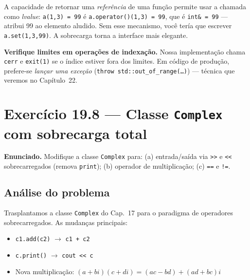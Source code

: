 \documentclass[11pt,a4paper]{article}
\begin{document}
\begin{obseng}
A capacidade de retornar uma \emph{refer\^encia} de uma fun\c{c}\~ao permite usar a chamada como \emph{lvalue}: \texttt{a(1,3) = 99} \'e \texttt{a.operator()(1,3) = 99}, que \'e \texttt{int\& = 99} --- atribui 99 ao elemento aludido. Sem esse mecanismo, voc\^e ter\'ia que escrever \texttt{a.set(1,3,99)}. A sobrecarga torna a interface mais elegante.
\end{obseng}

\begin{boaprat}
\textbf{Verifique limites em opera\c{c}\~oes de indexa\c{c}\~ao.} Nossa implementa\c{c}\~ao chama \texttt{cerr} e \texttt{exit(1)} se o \'indice estiver fora dos limites. Em c\'odigo de produ\c{c}\~ao, prefere-se \emph{lan\c{c}ar uma exce\c{c}\~ao} (\texttt{throw std::out\_of\_range(\ldots)}) --- t\'ecnica que veremos no Cap\'itulo~22.
\end{boaprat}

\newpage
\section{Exerc\'icio 19.8 --- Classe \texttt{Complex} com sobrecarga total}

\begin{enunciado}
\textbf{Enunciado.} Modifique a classe \texttt{Complex} para: (a) entrada/sa\'ida via \texttt{>>} e \texttt{<<} sobrecarregados (remova \texttt{print}); (b) operador de multiplica\c{c}\~ao; (c) \texttt{==} e \texttt{!=}.
\end{enunciado}

\subsection*{An\'alise do problema}

Trasplantamos a classe \texttt{Complex} do Cap.~17 para o paradigma de operadores sobrecarregados. As mudan\c{c}as principais:

\begin{itemize}[leftmargin=*,itemsep=0pt]
  \item \texttt{c1.add(c2)} $\rightarrow$ \texttt{c1 + c2}
  \item \texttt{c.print()} $\rightarrow$ \texttt{cout << c}
  \item Nova multiplica\c{c}\~ao: $(a+bi)(c+di) = (ac-bd) + (ad+bc)i$
\end{itemize}
\end{document}
